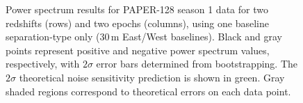 \begin{figure}
	\caption*{\vspace{0.005cm}}
	\caption{Power spectrum results for PAPER-128 season 1 data for two redshifts (rows) and two epochs (columns), using one baseline separation-type only (30\,m East/West baselines). Black and gray points represent positive and negative power spectrum values, respectively, with $2\sigma$ error bars determined from bootstrapping. The $2\sigma$ theoretical noise sensitivity prediction is shown in green. Gray shaded regions correspond to theoretical errors on each data point.}
	\label{fig:psa128_ps}
\end{figure}
